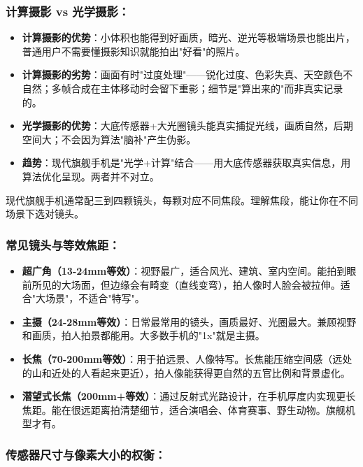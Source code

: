 \subsubsection*{计算摄影 vs 光学摄影：}

\begin{itemize}
  \item \textbf{计算摄影的优势}：小体积也能得到好画质，暗光、逆光等极端场景也能出片，普通用户不需要懂摄影知识就能拍出"好看"的照片。
  \item \textbf{计算摄影的劣势}：画面有时"过度处理"——锐化过度、色彩失真、天空颜色不自然；多帧合成在主体移动时会留下重影；细节是"算出来的"而非真实记录的。
  \item \textbf{光学摄影的优势}：大底传感器+大光圈镜头能真实捕捉光线，画质自然，后期空间大；不会因为算法"脑补"产生伪影。
  \item \textbf{趋势}：现代旗舰手机是"光学+计算"结合——用大底传感器获取真实信息，用算法优化呈现。两者并不对立。
\end{itemize}


现代旗舰手机通常配三到四颗镜头，每颗对应不同焦段。理解焦段，能让你在不同场景下选对镜头。

\subsubsection*{常见镜头与等效焦距：}

\begin{itemize}
  \item \textbf{超广角（13-24mm等效）}：视野最广，适合风光、建筑、室内空间。能拍到眼前所见的大场面，但边缘会有畸变（直线变弯），拍人像时人脸会被拉伸。适合"大场景"，不适合"特写"。
  \item \textbf{主摄（24-28mm等效）}：日常最常用的镜头，画质最好、光圈最大。兼顾视野和画质，拍人拍景都能用。大多数手机的"1x"就是主摄。
  \item \textbf{长焦（70-200mm等效）}：用于拍远景、人像特写。长焦能压缩空间感（远处的山和近处的人看起来更近），拍人像能获得更自然的五官比例和背景虚化。
  \item \textbf{潜望式长焦（200mm+等效）}：通过反射式光路设计，在手机厚度内实现更长焦距。能在很远距离拍清楚细节，适合演唱会、体育赛事、野生动物。旗舰机型才有。
\end{itemize}

\subsubsection*{传感器尺寸与像素大小的权衡：}

